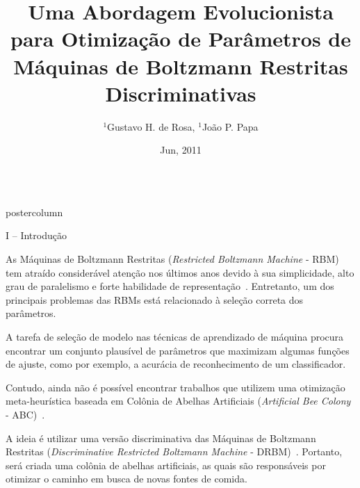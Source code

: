 \documentclass[final,hyperref={pdfpagelabels=false}]{beamer}
\title{\Huge Uma Abordagem Evolucionista para Otimização de Parâmetros de Máquinas de Boltzmann Restritas Discriminativas}
\author{\Large $^1$Gustavo H. de Rosa, $^1$Jo\~ao P. Papa}
\institute[UNESP, FATEC]{$^1$Universidade Estadual Paulista "Júlio de Mesquita Filho"}
\date[Jun, 2011]{Jun, 2011}
\newlength{\columnheight}
\begin{document}
\begin{frame}
  \begin{columns}
    \begin{column}{.45\textwidth}
      \begin{beamercolorbox}[center,wd=\textwidth]{postercolumn}
        \begin{minipage}[T]{.95\textwidth}  %
          \parbox[t][\columnheight]{\textwidth}{ %
  
            \begin{block}{\vspace*{-7pt} \large I -- Introdução}
              \begin{itemize}
              
              {\small \item As Máquinas de Boltzmann Restritas (\emph{Restricted Boltzmann Machine} - RBM) tem atraído considerável atenção nos últimos anos devido à sua simplicidade, alto grau de paralelismo e forte habilidade de representação~\cite{Hinton:12}. Entretanto, um dos principais problemas das RBMs está relacionado à seleção correta dos parâmetros.
              \item A tarefa de seleção de modelo nas técnicas de aprendizado de máquina procura encontrar um conjunto plausível de parâmetros que maximizam algumas funções de ajuste, como por exemplo, a acurácia de reconhecimento de um classificador.
              \item Contudo, ainda não é possível encontrar trabalhos que utilizem uma otimização meta-heurística baseada em Colônia de Abelhas Artificiais (\emph{Artificial Bee Colony} - ABC)~\cite{karaboga07}.
              \item A ideia é utilizar uma versão discriminativa das Máquinas de Boltzmann Restritas (\emph{Discriminative Restricted Boltzmann Machine} - DRBM)~\cite{Larochelle:12}. Portanto, será criada uma colônia de abelhas artificiais, as quais são responsáveis por otimizar o caminho em busca de novas fontes de comida.}
              
              \end{itemize}              
            \end{block}
            \vspace*{14pt}
            
}
\end{minipage}
\end{beamercolorbox}
\end{column}
\end{columns}
\end{frame}
\end{document}
